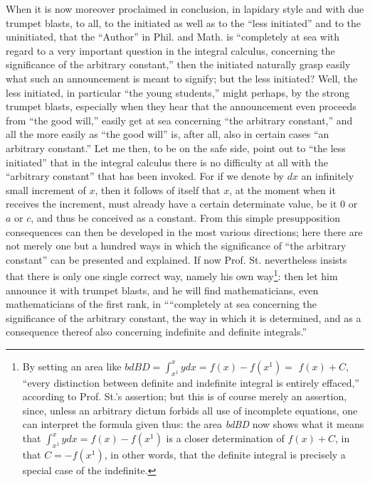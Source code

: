 \documentclass[12pt,a4paper,openany]{book}
\newcommand{\opage}[1]{\marginnote{\footnotesize\textit{[#1]}}}
\begin{document}
\opage{29}\setcounter{footnote}{0}%
When it is now moreover proclaimed in conclusion, in lapidary style
and with due trumpet blasts, to all, to the initiated as well as to the ``less initiated'' and to the uninitiated, that
the ``Author'' in Phil. and Math. is ``completely at sea
with regard to a very important question in the integral calculus, concerning the significance of the arbitrary constant,''
then the initiated naturally grasp easily what such an announcement is meant to signify; but the less initiated? Well,
the less initiated, in particular ``the young students,'' might
perhaps, by the strong trumpet blasts, especially when they hear
that the announcement even proceeds from ``the good will,''
easily get at sea concerning ``the arbitrary constant,''
and all the more easily as ``the good will'' is, after all, also in
\opage{30}\setcounter{footnote}{0}%
certain cases ``an arbitrary constant.'' Let me then, to
be on the safe side, point out to ``the less initiated'' that in the integral calculus there is no difficulty at all with the ``arbitrary constant'' that has been invoked.
For if we denote by $dx$ an infinitely small increment of $x$,
then it follows of itself that $x$, at the moment when it receives
the increment, must already have a certain determinate value, be
it $0$ or $a$ or $c$, and thus be conceived as a constant.
From this simple presupposition consequences can then be developed in the most various directions; here there are not merely
one but a hundred ways in which the significance of ``the
\opage{31}\setcounter{footnote}{0}%
arbitrary constant'' can be presented and explained. If now
Prof. St. nevertheless insists that there is only
one single correct way, namely his own way\footnote{By setting an area like $bdBD = \int_{x^{1}}^{x} y dx = f(x) - f(x^{1}) =$
$f(x) + C$, ``every distinction
between definite and indefinite integral is entirely effaced,'' according to Prof. St.'s assertion; but this
is of course merely an assertion, since, unless an arbitrary dictum forbids all use of incomplete equations, one
can interpret the formula given thus: the area \textit{bdBD} now shows
what it means that $\int_{x^{1}}^{x} y dx = f(x) - f(x^{1})$ is a closer
determination of $f(x) + C$, in that $C = - f(x^{1})$, in other words, that
the definite integral is precisely a special case of the indefinite.}: then
let him announce it with trumpet blasts, and he will find
mathematicians, even mathematicians of the first rank, in
``{}``completely at sea concerning the significance of the arbitrary constant,
the way in which it is determined, and as a consequence
thereof also concerning indefinite and definite integrals.''
\end{document}

